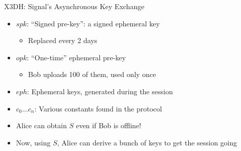 \documentclass[aspectratio=169, lualatex, handout]{beamer}
\begin{document}
\begin{frame}{X3DH: Signal's Asynchronous Key Exchange}
	\begin{itemize}
		\item $spk$: ``Signed pre-key'': a signed ephemeral key
		      \begin{itemize}
			      \item Replaced every 2 days
		      \end{itemize}
		\item $opk$: ``One-time'' ephemeral pre-key
		      \begin{itemize}
			      \item Bob uploads 100 of them, used only once
		      \end{itemize}
		\item $eph$: Ephemeral keys, generated during the session
		\item $c_0 \ldots c_n$: Various constants found in the protocol
		\item Alice can obtain $S$ even if Bob is offline!
		\item Now, using $S$, Alice can derive a bunch of keys to get the session going
	\end{itemize}
\end{frame}
\end{document}
